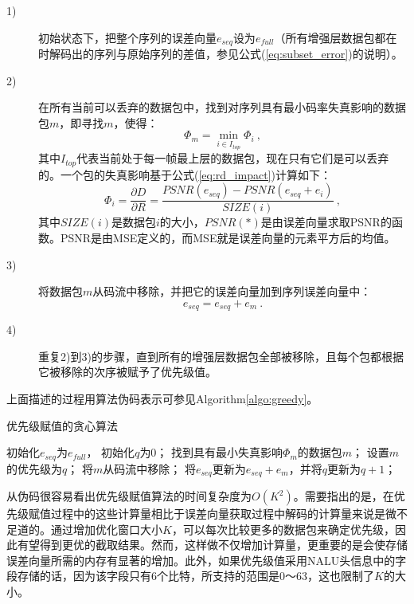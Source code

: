 \begin{description}
	\item[1)] 初始状态下，把整个序列的误差向量$e_{seq}$设为$e_{full}$（所有增强层数据包都在时解码出的序列与原始序列的差值，参见公式(\ref{eq:subset_error})的说明）。
	\item[2)] 在所有当前可以丢弃的数据包中，找到对序列具有最小码率失真影响的数据包$m$，即寻找$m$，使得：
	\begin{equation}
	\label{eq:R-D_impact_m}
	\Phi_m = \min_{i \in I_{top}} \Phi_i \: ,
	\end{equation}
	其中$I_{top}$代表当前处于每一帧最上层的数据包，现在只有它们是可以丢弃的。一个包的失真影响基于公式(\ref{eq:rd_impact})计算如下： 
	\begin{equation}
	\label{eq:R-D_impact_i}
	\Phi_i = \dfrac{\partial D}{\partial R} = \dfrac{PSNR(e_{seq}) - PSNR(e_{seq} + e_i)}{SIZE(i)} \: ,
	\end{equation}
	其中$SIZE(i)$是数据包$i$的大小，$PSNR(*)$是由误差向量求取PSNR的函数。PSNR是由MSE定义的，而MSE就是误差向量的元素平方后的均值。
	\item[3)]将数据包$m$从码流中移除，并把它的误差向量加到序列误差向量中：
	\begin{equation}
	\label{eq:error_update}
	e_{seq} = e_{seq} + e_m \: .
	\end{equation}
	\item[4)]重复2)到3)的步骤，直到所有的增强层数据包全部被移除，且每个包都根据它被移除的次序被赋予了优先级值。
\end{description}

上面描述的过程用算法伪码表示可参见Algorithm\ref{algo:greedy}。

\begin{algorithm}
	\caption{优先级赋值的贪心算法}
	\label{algo:greedy}
	\begin{algorithmic}
		\STATE 初始化$e_{seq}$为$e_{full}$， 初始化$q$为0；
		\STATE 找到具有最小失真影响$\Phi_m$的数据包$m$；
		\ENDFOR
		\STATE 设置$m$的优先级为$q$；
		\STATE 将$m$从码流中移除；
		\STATE 将$e_{seq}$更新为$e_{seq} + e_m$，并将$q$更新为$q+1$；
		\ENDWHILE
	\end{algorithmic}
\end{algorithm}

从伪码很容易看出优先级赋值算法的时间复杂度为$O(K^2)$。需要指出的是，在优先级赋值过程中的这些计算量相比于误差向量获取过程中解码的计算量来说是微不足道的。通过增加优化窗口大小$K$，可以每次比较更多的数据包来确定优先级，因此有望得到更优的截取结果。然而，这样做不仅增加计算量，更重要的是会使存储误差向量所需的内存有显著的增加。此外，如果优先级值采用NALU头信息中的字段存储的话，因为该字段只有6个比特，所支持的范围是0～63，这也限制了$K$的大小。

